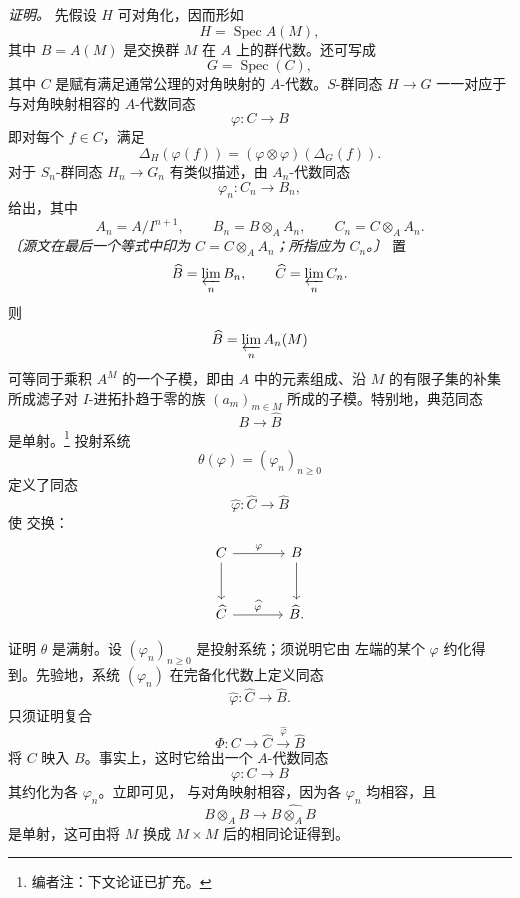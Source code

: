 \emph{证明。}
先假设 \(H\) 可对角化，因而形如
\[
  H=\operatorname{Spec}A(M),
\]
其中 \(B=A(M)\) 是交换群 \(M\) 在 \(A\) 上的群代数。还可写成
\[
  G=\operatorname{Spec}(C),
\]
其中 \(C\) 是赋有满足通常公理的对角映射的 \(A\)-代数。\(S\)-群同态 \(H\to G\) 一一对应于与对角映射相容的 \(A\)-代数同态
\[
  \varphi:C\longrightarrow B
\]
即对每个 \(f\in C\)，满足
\[
  \Delta_H(\varphi(f))
  =(\varphi\otimes\varphi)(\Delta_G(f)).
\]
对于 \(S_n\)-群同态 \(H_n\to G_n\) 有类似描述，由 \(A_n\)-代数同态
\[
  \varphi_n:C_n\longrightarrow B_n,
\]
给出，其中
\[
  A_n=A/I^{n+1},
  \qquad
  B_n=B\otimes_AA_n,
  \qquad
  C_n=C\otimes_AA_n.
\]
\emph{〔源文在最后一个等式中印为 \(C=C\otimes_AA_n\)；所指应为 \(C_n\)。〕}
置
\[
  \widehat B=\varprojlim_n B_n,
  \qquad
  \widehat C=\varprojlim_n C_n.
\]
则
\[
  \widehat B=\varprojlim_n A_n(M)
\]
可等同于乘积 \(A^M\) 的一个子模，即由 \(A\) 中的元素组成、沿 \(M\) 的有限子集的补集所成滤子对 \(I\)-进拓扑趋于零的族 \((a_m)_{m\in M}\) 所成的子模。特别地，典范同态
\[
  B\longrightarrow\widehat B
\]
是单射。\footnote{编者注：下文论证已扩充。}
投射系统
\[
  \theta(\varphi)=(\varphi_n)_{n\geq0}
\]
定义了同态
\[
  \widehat\varphi:\widehat C\longrightarrow\widehat B
\]
使  交换：
\[
\begin{tikzcd}[column sep=large,row sep=large]
  C
    \arrow[r,"\varphi"]
    \arrow[d]
  & B
    \arrow[d]
  \\
  \widehat C
    \arrow[r,"\widehat\varphi"]
  & \widehat B.
\end{tikzcd}
\]

证明 \(\theta\) 是满射。设 \((\varphi_n)_{n\geq0}\) 是投射系统；须说明它由  左端的某个 \(\varphi\) 约化得到。先验地，系统 \((\varphi_n)\) 在完备化代数上定义同态
\[
  \widehat\varphi:\widehat C\longrightarrow\widehat B.
\]
只须证明复合
\[
  \Phi:
  C\longrightarrow\widehat C
   \xrightarrow{\widehat\varphi}\widehat B
\]
将 \(C\) 映入 \(B\)。事实上，这时它给出一个 \(A\)-代数同态
\[
  \varphi:C\longrightarrow B
\]
其约化为各 \(\varphi_n\)。立即可见， 与对角映射相容，因为各 \(\varphi_n\) 均相容，且
\[
  B\otimes_AB\longrightarrow\widehat{B\otimes_AB}
\]
是单射，这可由将 \(M\) 换成 \(M\times M\) 后的相同论证得到。


